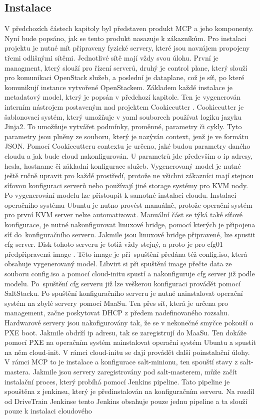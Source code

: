 \subsection{Instalace}\label{sec:chap4instal}
V předchozích částech kapitoly byl představen produkt MCP a jeho komponenty. Nyní bude popsáno, jak se tento produkt nasazuje k zákazníkům. Pro instalaci projektu je nutné mít připraveny fyzické servery, které jsou navzájem propojeny třemi odlišnými sítěmi. Jednotlivé sítě mají vždy svou úlohu. První je managment, který slouží pro řízení serverů, druhý je control plane, který slouží pro komunikaci OpenStack služeb, a poslední je dataplane, což je síť, po které komunikují instance vytvořené OpenStackem. Základem každé instalace je metadatový model, který je popsán v předchozí kapitole. Ten je vygenerován interním nástrojem postaveným nad projektem Cookiecutter \cite{cookiecutter}. Cookiecutter je šablonovací systém, který umožňuje v yaml souborech používat logiku jazyku Jinja2. To umožňuje vytvářet podmínky, proměnné, parametry či cykly. Tyto parametry jsou plněny ze souboru, který je nazýván context, jenž je ve formátu JSON. Pomocí Cookiecutteru contextu je určeno, jaké budou parametry daného cloudu a jak bude cloud nakonfigurován. U parametrů jde především o ip adresy, hesla, hostname či základní konfigurace služeb. Vygenerovaný model je nutné ještě ručně upravit pro každé prostředí, protože ne všichni zákazníci mají stejnou síťovou konfiguraci serverů nebo používají jiné storage systémy pro KVM nody. Po vygenerování modelu lze přistoupit k samotné instalaci cloudu. Instalaci operačního systému Ubuntu je nutno provést manuálně, protože operační systém pro první KVM server nelze automatizovat. Manuální část se týká také síťové konfigurace, je nutné nakonfigurovat linuxové bridge, pomocí kterých je připojena síť do konfiguračního serveru. Jakmile jsou linuxové bridge připravené, lze spustit cfg server. Disk tohoto serveru je totiž vždy stejný, a proto je pro cfg01 předpřipravená image \cite{day01_image}. Této image je při spuštění předána též config.iso, která obsahuje vygenerovaný model. Libvirt si při spuštění image přečte data ze souboru config.iso a pomocí cloud-initu spustí a nakonfiguruje cfg server již podle modelu. Po spuštění cfg serveru již lze veškerou konfiguraci provádět pomocí SaltStacku. Po spuštění konfiguračního serveru je nutné nainstalovat operační systém na zbylé servery pomocí MaaSu. Ten přes síť, která je určena pro management, začne poskytovat DHCP z předem nadefinovaného rozsahu. Hardwarové servery jsou nakofigurovány tak, že se v nekonečné smyčce pokouší o PXE boot. Jakmile obdrží ip adresu, tak se zaregistrují do MaaSu. Ten dokáže pomocí PXE na operačním systém nainstalovat operační systém Ubuntu a spustit na něm cloud-init. V rámci cloud-initu se dají provádět další poinstalační úlohy. V rámci MCP to je instalace a konfigurace salt-minionu, ten spouští stavy z salt-mastera. Jakmile jsou servery zaregistrovány pod salt-masterem, může začít instalační proces, který probíhá pomocí Jenkins pipeline. Tato pipeline je spouštěna z jenkinsu, který je předinstalován na konfiguračním serveru. Na rozdíl od DriveTrain Jenkinse tento Jenkins obsahuje pouze jednu pipeline a ta slouží pouze k instalaci cloudového 